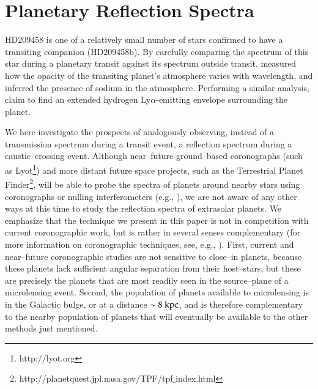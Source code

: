 \section{Planetary Reflection Spectra}
\label{micro_sec:prspectra}
HD209458 is one of a relatively small number of stars confirmed to
have a transiting companion (HD209458b).  By carefully comparing the
spectrum of this star during a planetary transit against its spectrum
outside transit, \citet{charbonneau_et_al2002} measured how the
opacity of the transiting planet's atmosphere varies with wavelength,
and inferred the presence of sodium in the atmosphere.  Performing a
similar analysis, \citet{vidal-madjar_et_al2003} claim to find an
extended hydrogen Ly$\alpha$-emitting envelope surrounding the planet.

We here investigate the prospects of analogously observing, instead of
a transmission spectrum during a transit event, a reflection spectrum
during a caustic--crossing event.
%
Although near--future ground--based coronographs (such as
Lyot\footnote{http://lyot.org}) and more distant future space
projects, such as the Terrestrial Planet
Finder\footnote{http://planetquest.jpl.nasa.gov/TPF/tpf$\_$index.html},
will be able to probe the spectra of planets around nearby stars using
coronographs or nulling interferometers (e.g.,
\citet{kuchner+Traub2002}), we are not aware of any other ways at this
time to study the reflection spectra of extrasolar planets.  We
emphasize that the technique we present in this paper is not in
competition with current coronographic work, but is rather in several
senses complementary (for more information on coronographic
techniques, see, e.g., \citet{oppenheimer_et_al2001}).  First, current
and near--future coronographic studies are not sensitive to close--in
planets, because these planets lack sufficient angular separation from
their host--stars, but these are precisely the planets that are most
readily seen in the source--plane of a microlensing event.  Second,
the population of planets available to microlensing is in the Galactic
bulge, or at a distance $\sim8{\rm~kpc}$, and is therefore
complementary to the nearby population of planets that will eventually
be available to the other methods just mentioned.

